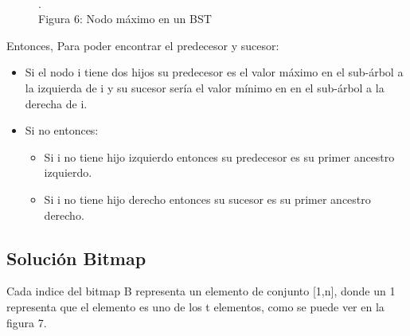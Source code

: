 \documentclass[11pt]{article}
\begin{document}
\begin{figure}[htp]
\begin{minipage}{.4\textwidth}
\\\scriptsize{\color{white}.\color{black}\\Figura 6: Nodo máximo en un BST}
\label{etiqueta}
\end{minipage}
\end{figure}

Entonces, Para poder encontrar el predecesor y sucesor:
\begin{itemize}
\item Si el nodo i tiene dos hijos su predecesor es el valor máximo en el sub-árbol a la izquierda de i y su sucesor sería el valor mínimo en en el sub-árbol a la derecha de i.
\item Si no entonces:
\begin{itemize}
\item Si i no tiene hijo izquierdo entonces su predecesor es su primer ancestro izquierdo.
\item Si i no tiene hijo derecho entonces su sucesor es su primer ancestro derecho.
\end{itemize}
\end{itemize}
\subsection{Solución Bitmap}
Cada indice del bitmap B representa un elemento de conjunto [1,n], donde un 1 representa que el elemento es uno de los t elementos, como se puede ver en la figura 7.\\
\end{document}
